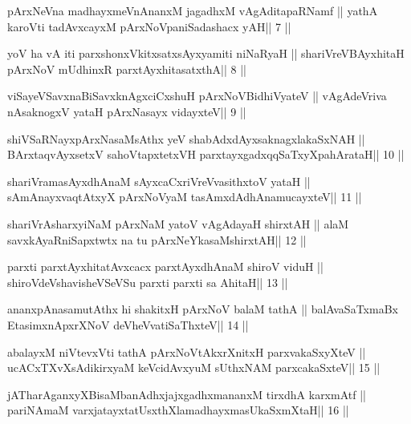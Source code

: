 \begin{shl}
pArxNeVna madhayxmeVnAnanxM jagadhxM vAgAditapaRNamf ||
yathA karoVti tadAvxcayxM pArxNoVpaniSadashacx yAH\hfill || 7 ||
\end{shl}

\begin{shl}
yoV ha vA iti parxshonxVkitxsatxsAyxyamiti niNaRyaH ||
shariVreV\s BAyxhitaH pArxNoV mUdhinxR parxtAyxhitasatxthA\hfill || 8 ||
\end{shl}

\begin{shl}
viSayeVSavxnaBiSavxknAgxciCxshuH  pArxNoV\s BidhiVyateV ||
vAgAdeVriva nA\s\s saknogxV yataH pArxNasayx vidayxteV\hfill || 9 ||
\end{shl}

\begin{shl}
shiVSaRNayxpArxNasaMsAthx yeV shabAdxdAyxsaknagxlakaSxNAH ||
BArxtaqvAyxsetxV sahoVtapxtetxVH parxtayxgadxqqSaTxyXpahArataH\hfill || 10 ||
\end{shl}

\begin{shl}
shariVramasAyx\s\s dhAnaM sAyxcaCxriVreV\s vasithxtoV yataH ||
sAmAnayxvaqtAtxyX pArxNoV\s yaM tasAmxdAdhAnamucayxteV\hfill || 11 ||
\end{shl}

\begin{shl}
shariVrAsharxyiNaM pArxNaM yatoV vAgAdayaH shirxtAH ||
alaM savxkAyaRniSapxtwtx na tu pArxNeYkasaMshirxtAH\hfill || 12 ||
\end{shl}

\begin{shl}
parxti parxtAyxhitatAvxcacx parxtAyxdhAnaM shiroV viduH ||
shiroVdeVshavisheVSeVSu parxti parxti sa AhitaH\hfill || 13 ||
\end{shl}

\begin{shl}
ananxpAnasamutAthx hi shakitxH pArxNoV balaM tathA ||
balAvaSaTxmaBx EtasimxnApxrXNoV deVheV\s vatiSaThxteV\hfill || 14 ||
\end{shl}

\begin{shl}
abalayxM niVtevxVti tathA pArxNoVtAkxrXnitxH parxvakaSxyXteV ||
ucACxTXvXsAdikirxyaM keVcidAvxyuM sUthxNAM parxcakaSxteV\hfill || 15 ||
\end{shl}

\begin{shl}
jATharAganxyXBisaMbanAdhxjajxgadhxmananxM tirxdhA karxmAtf ||
pariNAmaM varxjatayxtatUsxthXlamadhayxmasUkaSxmXtaH\hfill || 16 ||
\end{shl}

